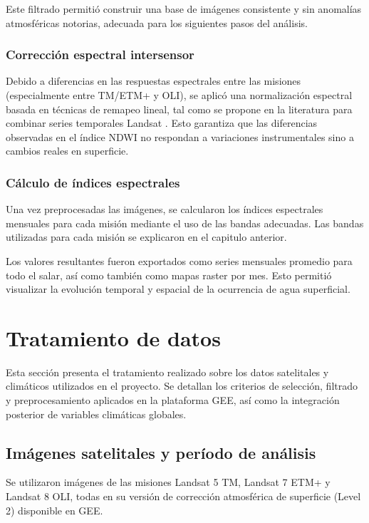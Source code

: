 Este filtrado permitió construir una base de imágenes consistente y sin anomalías atmosféricas notorias, adecuada para los siguientes pasos del análisis.



\subsubsection*{Corrección espectral intersensor}

Debido a diferencias en las respuestas espectrales entre las misiones (especialmente entre TM/ETM+ y OLI), se aplicó una normalización espectral basada en técnicas de remapeo lineal, tal como se propone en la literatura para combinar series temporales Landsat \parencite{roy2016characterization, roy2014landsat8}. Esto garantiza que las diferencias observadas en el índice NDWI no respondan a variaciones instrumentales sino a cambios reales en superficie.

\subsubsection*{Cálculo de índices espectrales}

Una vez preprocesadas las imágenes, se calcularon los índices espectrales mensuales para cada misión mediante el uso de las bandas adecuadas. Las bandas utilizadas para cada misión se explicaron en el capitulo anterior.

Los valores resultantes fueron exportados como series mensuales promedio para todo el salar, así como también como mapas raster por mes. Esto permitió visualizar la evolución temporal y espacial de la ocurrencia de agua superficial.

\section{Tratamiento de datos }

Esta sección presenta el tratamiento realizado sobre los datos satelitales y climáticos utilizados en el proyecto. Se detallan los criterios de selección, filtrado y preprocesamiento aplicados en la plataforma GEE, así como la integración posterior de variables climáticas globales.

\subsection*{Imágenes satelitales y período de análisis}

Se utilizaron imágenes de las misiones Landsat 5 TM, Landsat 7 ETM+ y Landsat 8 OLI, todas en su versión de corrección atmosférica de superficie (Level 2) disponible en GEE.

